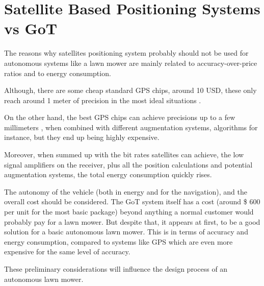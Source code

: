 \section{Satellite Based Positioning Systems vs GoT}
The reasons why satellites positioning system probably should not be used for autonomous systems like a lawn mower are mainly related to accuracy-over-price ratios and to energy consumption.

Although, there are some cheap standard GPS chips, around 10 USD, these only reach around 1 meter of precision in the most ideal situations \cite{GPSUSWebsiteAccuracy,Miller}.

On the other hand, the best GPS chips can achieve precisions up to a few millimeters \cite{GPSUSWebsiteAccuracy}, when combined with different augmentation systems, algorithms for instance, but they end up being highly expensive.

Moreover, when summed up with the bit rates satellites can achieve, the low signal amplifiers on the receiver, plus all the position calculations and potential augmentation systems, the total energy consumption quickly rises.

The autonomy of the vehicle (both in energy and for the navigation), and the overall cost should be considered. The GoT system itself has a cost (around \$ $600$ per unit for the most basic package) beyond anything a normal customer would probably pay for a lawn mower. But despite that, it appears at first, to be a good solution for a basic autonomous lawn mower. This is in terms of accuracy and energy consumption, compared to systems like GPS which are even more expensive for the same level of accuracy.

These preliminary considerations will influence the design process of an autonomous lawn mower.